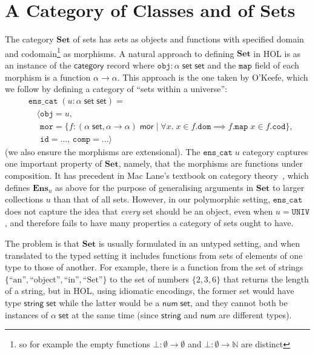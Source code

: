 \documentclass[twoside,titlepage,11pt]{article}
\begin{document}
\section{A Category of Classes and of Sets}%
\label{Set}
\newcommand{\Set}{\ensuremath{\mathbf{Set}}}
The category $\Set$ of sets has sets as objects and functions with specified domain and codomain\footnote{so for example the empty functions $\bot:\emptyset\to\emptyset$ and $\bot:\emptyset\to\mathbb{N}$ are distinct} as morphisms.
A natural approach to defining $\Set$ in HOL is as an instance of the $\mathsf{category}$ record where $\mathtt{obj}:\alpha\;\mathsf{set}\;\mathsf{set}$ and the $\mathtt{map}$ field of each morphism is a function $\alpha\to\alpha$.
This approach is the one taken by O'Keefe, which we follow by defining a category of ``sets within a universe'':
\begin{align*}
&\mathtt{ens\_cat}\;(u:\alpha\;\mathsf{set}\;\mathsf{set})=\\
&\quad\langle\mathtt{obj}=u,\\
&\quad\phantom{\langle}\mathtt{mor}=\{f:(\alpha\;\mathsf{set},\alpha\to\alpha)\;\mathsf{mor}\mid \forall{x}.\;x\in f.\mathtt{dom}\implies f.\mathtt{map}\;x\in f.\mathtt{cod}\},\\
&\quad\phantom{\langle}\mathtt{id}=\dots,\,\mathtt{comp}=\dots\rangle
\end{align*}
(we also ensure the morphisms are extensional).
The $\mathtt{ens\_cat}\;u$ category captures one important property of $\Set$, namely, that the morphisms are functions under composition.
It has precedent in Mac Lane's textbook on category theory~\cite{MacLaneCFTWM}, which defines $\mathbf{Ens}_u$ as above for the purpose of generalising arguments in $\Set$ to larger collections $u$ than that of all sets.
However, in our polymorphic setting, $\mathtt{ens\_cat}$ does not capture the idea that \emph{every} set should be an object, even when $u=\mathtt{UNIV}$, and therefore fails to have many properties a category of sets ought to have.

The problem is that $\Set$ is usually formulated in an untyped setting, and when translated to the typed setting it includes functions from sets of elements of one type to those of another.
For example, there is a function from the set of strings $\{\text{``an''},\text{``object''},\text{``in''},\text{``Set''}\}$ to the set of numbers $\{2,3,6\}$ that returns the length of a string, but in HOL, using idiomatic encodings, the former set would have type $\mathsf{string}\;\mathsf{set}$ while the latter would be a $\mathsf{num}\;\mathsf{set}$, and they cannot both be instances of $\alpha\;\mathsf{set}$ at the same time (since $\mathsf{string}$ and $\mathsf{num}$ are different types).
\end{document}
